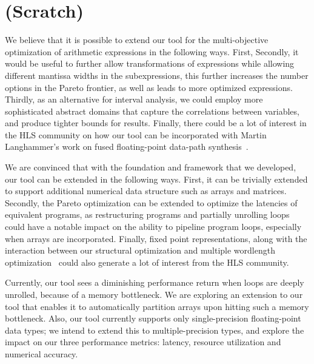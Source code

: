 \chapter{(Scratch)}

We believe that it is possible to extend our tool for the multi-objective
optimization of arithmetic expressions in the following ways. First, Secondly,
it would be useful to further allow transformations of expressions while
allowing different mantissa widths in the subexpressions, this further
increases the number options in the Pareto frontier, as well as leads to more
optimized expressions. Thirdly, as an alternative for interval analysis, we
could employ more sophisticated abstract domains that capture the correlations
between variables, and produce tighter bounds for results. Finally, there
could be a lot of interest in the HLS community on how our tool can be
incorporated with Martin Langhammer's work on fused floating-point data-path
synthesis~\cite{langhammer}.

We are convinced that with the foundation and framework that we developed,
our tool can be extended in the following ways.  First, it can be trivially
extended to support additional numerical data structure such as arrays and
matrices.  Secondly, the Pareto optimization can be extended to optimize the
latencies of equivalent programs, as restructuring programs and partially
unrolling loops could have a notable impact on the ability to pipeline
program loops, especially when arrays are incorporated.  Finally, fixed point
representations, along with the interaction between our structural optimization
and multiple wordlength optimization~\cite{constantinides} could also generate
a lot of interest from the HLS community.

Currently, our tool sees a diminishing performance return when loops are deeply
unrolled, because of a memory bottleneck. We are exploring an extension to
our tool that enables it to automatically partition arrays upon hitting such
a memory bottleneck. Also, our tool currently supports only single-precision
floating-point data types; we intend to extend this to multiple-precision
types, and explore the impact on our three performance metrics: latency,
resource utilization and numerical accuracy.


\cleardoublepage{}


{%
\renewcommand{\bibfont}{\normalfont\small}
\setlength{\biblabelsep}{0pt}
\setlength{\bibitemsep}{0.5\baselineskip plus 0.5\baselineskip}
\printbibliography[]
}

\listoftodos

% 

% 


